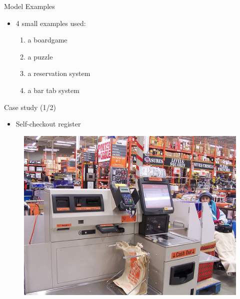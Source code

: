 \documentclass{FMTslides}
\begin{document}
\begin{frame}{Model Examples}
\begin{itemize}
  \item 4 small examples used:
  \begin{enumerate}
    \item a boardgame
    \item a puzzle
    \item a reservation system
    \item a bar tab system
  \end{enumerate}
\end{itemize}
\end{frame}

\begin{frame}{Case study (1/2)}
  \begin{itemize}
  \item Self-checkout register
\end{itemize}
\begin{figure}
\centering\includegraphics[scale=0.4]{./figures/self-check-out.jpg}
\end{figure}
\end{frame}
\end{document}
